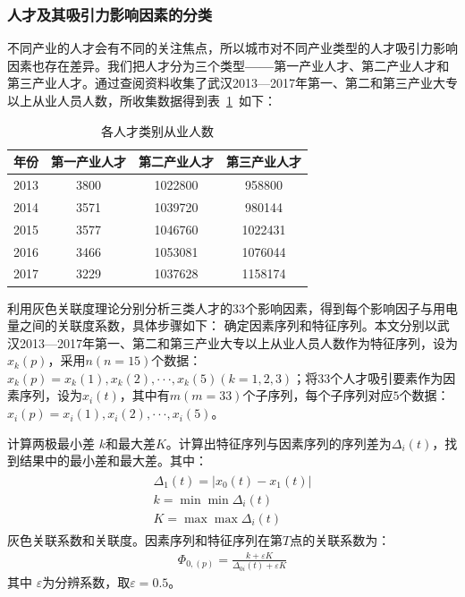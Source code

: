 \documentclass{whutmod}
\begin{document}
\begin{itemize}
	\subsubsection{人才及其吸引力影响因素的分类}
	不同产业的人才会有不同的关注焦点，所以城市对不同产业类型的人才吸引力影响因素也存在差异。我们把人才分为三个类型\textbf{——}第一产业人才、第二产业人才和第三产业人才。通过查阅资料\cite{武汉统计局}收集了武汉2013—2017年第一、第二和第三产业大专以上从业人员人数，所收集数据得到表~\ref{hhh}~如下：
	\begin{table}[H]
		\centering
		\caption{各人才类别从业人数}\label{hhh}
		\begin{tabular}{cccc}
			\toprule[2pt]
			\multicolumn{1}{m{2cm}}{\centering 年份}&
			\multicolumn{1}{m{3cm}}{\centering 第一产业人才} & \multicolumn{1}{m{3cm}}{\centering 第二产业人才} & \multicolumn{1}{m{3cm}}{\centering 第三产业人才}\\
			\midrule[1pt]
			2013	 &  3800 & 1022800&958800\\ 
			2014 & 3571 & 1039720&980144\\ 
			2015	 &  3577&1046760&1022431\\ 
			2016  &  3466& 1053081&1076044\\ 
			2017  & 3229& 1037628&1158174\\
			\bottomrule[2pt]
		\end{tabular}
	\end{table}

	利用灰色关联度理论分别分析三类人才的$33$个影响因素，得到每个影响因子与用电量之间的关联度系数，具体步骤如下：
	确定因素序列和特征序列。本文分别以武汉2013—2017年第一、第二和第三产业大专以上从业人员人数作为特征序列，设为$x_{k}(p)$，采用$n(n=15)$个数据：$x_{k}(p)={x_{k}(1),x_{k}(2),···,x_{k}(5)}(k=1,2,3)$；将$33$个人才吸引要素作为因素序列，设为$x_{i}(t)$，其中有$m(m=33)$个子序列，每个子序列对应$5$个数据：$x_{i}(p)={x_{i}(1),x_{i}(2),···,x_{i}(5)}$。
	
	计算两极最小差 $k$和最大差$K$。计算出特征序列与因素序列的序列差为$\Delta _{i}(t)$，找到结果中的最小差和最大差。其中：
	\begin{gather}
	\begin{array} { l } { \Delta _ { 1 } ( t ) = \left| x _ { 0 } ( t ) - x _ { 1 } ( t ) \right| } \\ { k = \min \min \Delta _ { i } ( t ) } \\ { K = \max \max \Delta _ { i } ( t ) } \end{array}
	\end{gather}
	灰色关联系数和关联度。因素序列和特征序列在第$T$点的关联系数为：
	\begin{gather}
	\Phi _ { 0 , ( p ) } = \frac { k + \varepsilon K } { \Delta _ { 0 i } ( t ) + \varepsilon K }
	\end{gather}
	其中 $\varepsilon$为分辨系数，取$\varepsilon=0.5$。


\end{itemize}
\end{document}

